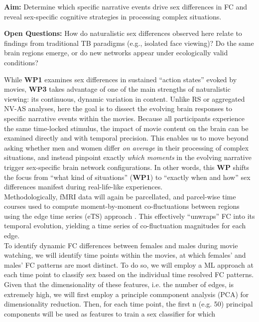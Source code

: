 \documentclass[11pt,a4paper]{article}
\begin{document}
\textbf{Aim:} Determine which specific narrative events drive sex differences in FC 
and reveal sex-specific cognitive strategies in processing complex situations.  

\textbf{Open Questions:} How do naturalistic sex differences observed here relate to findings 
from traditional TB paradigms (e.g., isolated face viewing)? Do the same brain regions emerge, 
or do new networks appear under ecologically valid conditions?  

While \textbf{WP1} examines sex differences in sustained “action states” evoked by movies, 
\textbf{WP3} takes advantage of one of the main strengths of naturalistic viewing: its continuous, 
dynamic variation in content. Unlike RS or aggregated NV-AS analyses, here the goal is to dissect 
the evolving brain responses to specific narrative events within the movies. 
Because all participants experience the same time-locked stimulus, the impact of movie content on the 
brain can be examined directly and with temporal precision. This enables us to move beyond asking whether 
men and women differ \textit{on average} in their processing of complex situations, and 
instead pinpoint exactly \textit{which moments} in the evolving narrative trigger sex-specific brain network configurations. 
In other words, this \textbf{WP} shifts the focus from “what kind of situations” (\textbf{WP1}) to “exactly when and how” 
sex differences manifest during real-life-like experiences.\\  
Methodologically, fMRI data will again be parcellated, and parcel-wise time courses used to compute 
moment-by-moment co-fluctuations between regions using the edge time series (eTS) approach 
\parencite{betzelLivingEdgeNetwork2023,faskowitzEdgecentricFunctionalNetwork2020a}. 
This effectively “unwraps” FC into its temporal evolution, yielding a time series of 
co-fluctuation magnitudes for each edge.\\
To identify dynamic FC differences between females and males during movie watching, we will identify
time points within the movies, at which females' and males' FC patterns are most distinct. To do so, we
will employ a ML approach at each time point to classify sex based on the individual time resolved FC
patterns. Given that the dimensionality of these features, i.e. the number of edges, is extremely high, we
will first employ a principle commponent analysis (PCA) for dimensionality reduction. Then, for each time
point, the first n (e.g. 50) principal components will be used as features to train a sex classifier for which
\end{document}
